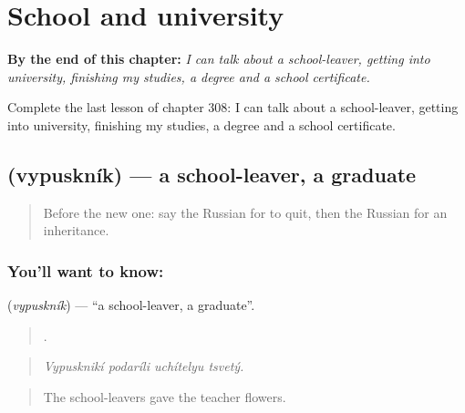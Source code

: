
\chapter{School and university}
\label{ch:ru-school-and-university}

\begin{chapteropening}
\textbf{By the end of this chapter:} \emph{I can talk about a school-leaver, getting into university, finishing my studies, a degree and a school certificate.}

Complete the last lesson of chapter 308: I can talk about a school-leaver, getting into university, finishing my studies, a degree and a school certificate.
\end{chapteropening}

\section[\texorpdfstring{\ru{выпускник} (vypuskník)}{выпускник (vypuskník)}]{ (vypuskník) — a school-leaver, a graduate}

\label{lesson:RU-C308-vypusknik}



\begin{quote}
Before the new one: say the Russian for to quit, then the Russian for an inheritance.
\end{quote}

\subsection*{You'll want to know: }
\textbf{} (\emph{vypuskník}) — \textquotedblleft{}a school-leaver, a graduate\textquotedblright{}.

\begin{quote}
   .
\end{quote}

\begin{quote}
\emph{Vypusknikí podaríli uchítelyu tsvetý.}
\end{quote}

\begin{quote}
The school-leavers gave the teacher flowers.
\end{quote}

